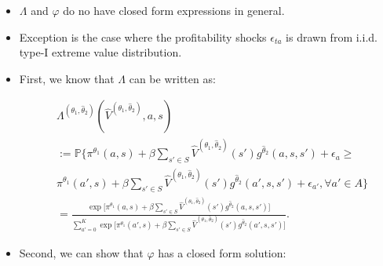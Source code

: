 \documentclass[]{book}
\providecommand{\tightlist}{%
  \setlength{\itemsep}{0pt}\setlength{\parskip}{0pt}}
\begin{document}
\begin{itemize}
\tightlist
\item
  \(\Lambda\) and \(\varphi\) do no have closed form expressions in
  general.
\item
  Exception is the case where the profitability shocks \(\epsilon_{ta}\)
  is drawn from i.i.d. type-I extreme value distribution.
\item
  First, we know that \(\Lambda\) can be written as:

  \begin{equation}
  \begin{split}
  &\Lambda^{(\theta_1, \hat{\theta}_2)}(\hat{V}^{(\theta_1, \hat{\theta}_2)}, a, s)\\
  &:= \mathbb{P}\Bigg\{\pi^{\theta_1}(a , s) + \beta \sum_{s' \in S} \hat{V}^{(\theta_1, \hat{\theta}_2)}(s') g^{\hat{\theta}_2}(a, s, s') + \epsilon_a \ge\\
  &\pi^{\theta_1}(a' , s) + \beta \sum_{s' \in S} \hat{V}^{(\theta_1, \hat{\theta}_2)}(s') g^{\hat{\theta}_2}(a', s, s') + \epsilon_{a'}, \forall a' \in A \Bigg\}\\
  &=\frac{\exp\Big[\pi^{\theta_1}(a , s) + \beta \sum_{s' \in S}\hat{V}^{(\theta_1, \hat{\theta}_2)}(s') g^{\hat{\theta}_2}(a, s, s')\Big]}{\sum_{a' = 0}^K \exp\Big[\pi^{\theta_1}(a' , s) + \beta \sum_{s' \in S} \hat{V}^{(\theta_1, \hat{\theta}_2)}(s') g^{\hat{\theta}_2}(a', s, s') \Big]}.
  \end{split}
  \end{equation}
\item
  Second, we can show that \(\varphi\) has a closed form solution:


\end{itemize}
\end{document}
